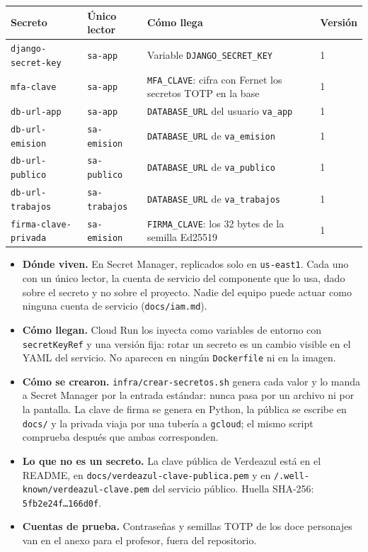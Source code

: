 \documentclass[11pt,letterpaper]{article}
\newcommand{\cab}[1]{\textbf{\rmfamily #1}}
\newcommand{\cod}[1]{\texttt{\small #1}}
\newcommand{\arch}[1]{\texttt{\small #1}}
\begin{document}
\begin{center}
\footnotesize
\renewcommand{\arraystretch}{1.12}
\begin{tabularx}{\textwidth}{@{}L{3.2cm} L{2.2cm} Y L{1.2cm}@{}}
\toprule
\cab{Secreto} & \cab{Único lector} & \cab{Cómo llega} & \cab{Versión} \\
\midrule
\cod{django-secret-key} & \cod{sa-app} & Variable \cod{DJANGO\_SECRET\_KEY} & 1 \\
\cod{mfa-clave} & \cod{sa-app} & \cod{MFA\_CLAVE}: cifra con Fernet los secretos TOTP en la base & 1 \\
\cod{db-url-app} & \cod{sa-app} & \cod{DATABASE\_URL} del usuario \cod{va\_app} & 1 \\
\cod{db-url-emision} & \cod{sa-emision} & \cod{DATABASE\_URL} de \cod{va\_emision} & 1 \\
\cod{db-url-publico} & \cod{sa-publico} & \cod{DATABASE\_URL} de \cod{va\_publico} & 1 \\
\cod{db-url-trabajos} & \cod{sa-trabajos} & \cod{DATABASE\_URL} de \cod{va\_trabajos} & 1 \\
\cod{firma-clave-privada} & \cod{sa-emision} & \cod{FIRMA\_CLAVE}: los 32 bytes de la semilla Ed25519 & 1 \\
\bottomrule
\end{tabularx}
\end{center}

\begin{itemize}
  \item \textbf{Dónde viven.} En Secret Manager, replicados solo en \cod{us-east1}. Cada uno con un
    único lector, la cuenta de servicio del componente que lo usa, dado sobre el secreto y no sobre el
    proyecto. Nadie del equipo puede actuar como ninguna cuenta de servicio (\cod{docs/iam.md}).
  \item \textbf{Cómo llegan.} Cloud Run los inyecta como variables de entorno con
    \cod{secretKeyRef} y una versión fija: rotar un secreto es un cambio visible en el YAML del
    servicio. No aparecen en ningún \cod{Dockerfile} ni en la imagen.
  \item \textbf{Cómo se crearon.} \arch{infra/crear-secretos.sh} genera cada valor y lo manda a
    Secret Manager por la entrada estándar: nunca pasa por un archivo ni por la pantalla. La clave
    de firma se genera en Python, la pública se escribe en \cod{docs/} y la privada viaja por una
    tubería a \cod{gcloud}; el mismo script comprueba después que ambas corresponden.
  \item \textbf{Lo que no es un secreto.} La clave pública de Verdeazul está en el README, en
    \cod{docs/verdeazul-clave-publica.pem} y en \cod{/.well-known/verdeazul-clave.pem} del servicio
    público. Huella SHA-256: \cod{5fb2e24f\ldots166d0f}.
  \item \textbf{Cuentas de prueba.} Contraseñas y semillas TOTP de los doce personajes van en el
    anexo para el profesor, fuera del repositorio.
\end{itemize}
\end{document}
